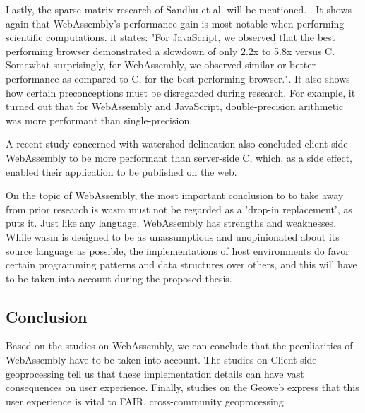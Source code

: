 Lastly, the sparse matrix research of Sandhu et al. will be mentioned. \cite{sandhu_sparse_2018}. It shows again that WebAssembly's performance gain is most notable when performing scientific computations. it states: "For JavaScript, we observed that the best performing browser demonstrated a slowdown of only 2.2x to 5.8x versus C. Somewhat surprisingly, for WebAssembly, we observed similar or better performance as compared to C, for the best performing browser.". It also shows how certain preconceptions must be disregarded during research. For example, it turned out that for WebAssembly and JavaScript, double-precision arithmetic was more performant than single-precision.

A recent study concerned with watershed delineation \cite{sit_optimized_2019} also concluded client-side WebAssembly to be more performant than server-side C, which, as a side effect, enabled their application to be published on the web. 

On the topic of WebAssembly, the most important conclusion to to take away from prior research is \ac{wasm} must not be regarded as a 'drop-in replacement', as \cite{melch_performance_2019} puts it. Just like any language, WebAssembly has strengths and weaknesses. While \ac{wasm} is designed to be as unassumptious and unopinionated about its source language as possible, the implementations of host environments do favor certain programming patterns and data structures over others, and this will have to be taken into account during the proposed thesis.


\subsection{Conclusion}

Based on the studies on WebAssembly, we can conclude that the peculiarities of WebAssembly have to be taken into account. The studies on Client-side geoprocessing tell us that these implementation details can have vast consequences on user experience. Finally, studies on the Geoweb express that this user experience is vital to FAIR, cross-community geoprocessing.